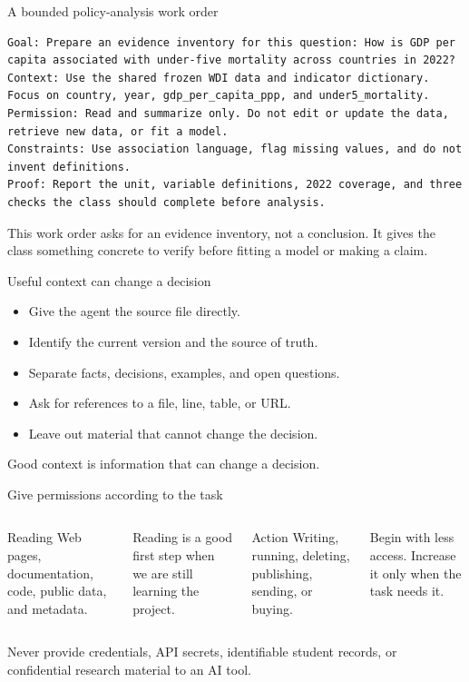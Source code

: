 \begin{frame}[fragile]{A bounded policy-analysis work order}
\begin{lstlisting}
Goal: Prepare an evidence inventory for this question: How is GDP per
capita associated with under-five mortality across countries in 2022?
Context: Use the shared frozen WDI data and indicator dictionary.
Focus on country, year, gdp_per_capita_ppp, and under5_mortality.
Permission: Read and summarize only. Do not edit or update the data,
retrieve new data, or fit a model.
Constraints: Use association language, flag missing values, and do not
invent definitions.
Proof: Report the unit, variable definitions, 2022 coverage, and three
checks the class should complete before analysis.
\end{lstlisting}

  \vfill
  This work order asks for an evidence inventory, not a conclusion. It gives
  the class something concrete to verify before fitting a model or making a claim.
\end{frame}

\begin{frame}{Useful context can change a decision}
  \begin{itemize}
    \item Give the agent the source file directly.
    \item Identify the current version and the source of truth.
    \item Separate facts, decisions, examples, and open questions.
    \item Ask for references to a file, line, table, or URL.
    \item Leave out material that cannot change the decision.
  \end{itemize}

  \vfill
  \begin{center}
    {\Large\color{crimson}Good context is information that can change a decision.}
  \end{center}
\end{frame}

\begin{frame}{Give permissions according to the task}
  \begin{columns}[T,onlytextwidth]
      \begin{block}{Reading}
        Web pages, documentation, code, public data, and metadata.
      \end{block}
      Reading is a good first step when we are still learning the project.
      \begin{block}{Action}
        Writing, running, deleting, publishing, sending, or buying.
      \end{block}
      Begin with less access. Increase it only when the task needs it.
  \end{columns}

  \vfill
  Never provide credentials, API secrets, identifiable student records, or
  confidential research material to an AI tool.
\end{frame}

